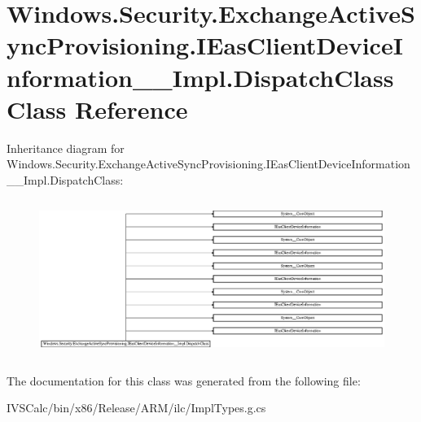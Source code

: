 \hypertarget{class_windows_1_1_security_1_1_exchange_active_sync_provisioning_1_1_i_eas_client_device_informa15df19f054218ff61c0f11552ac9499d}{}\section{Windows.\+Security.\+Exchange\+Active\+Sync\+Provisioning.\+I\+Eas\+Client\+Device\+Information\+\_\+\+\_\+\+Impl.\+Dispatch\+Class Class Reference}
\label{class_windows_1_1_security_1_1_exchange_active_sync_provisioning_1_1_i_eas_client_device_informa15df19f054218ff61c0f11552ac9499d}
Inheritance diagram for Windows.\+Security.\+Exchange\+Active\+Sync\+Provisioning.\+I\+Eas\+Client\+Device\+Information\+\_\+\+\_\+\+Impl.\+Dispatch\+Class\+:\begin{figure}[H]
\begin{center}
\leavevmode
\includegraphics[height=5.150502cm]{class_windows_1_1_security_1_1_exchange_active_sync_provisioning_1_1_i_eas_client_device_informa15df19f054218ff61c0f11552ac9499d}
\end{center}
\end{figure}


The documentation for this class was generated from the following file\+:\begin{DoxyCompactItemize}
\item 
I\+V\+S\+Calc/bin/x86/\+Release/\+A\+R\+M/ilc/Impl\+Types.\+g.\+cs\end{DoxyCompactItemize}
